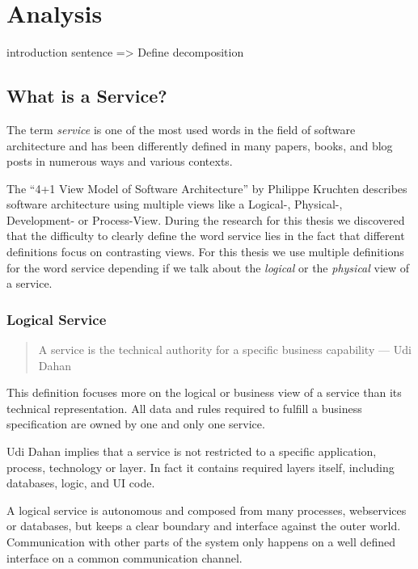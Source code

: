 
\chapter{Analysis}
\label{cha:analysis}

introduction sentence
=> Define decomposition

\section{What is a Service?}

The term \textit{service} is one of the most used words in the field of software architecture and has been differently defined in many papers, books, and blog posts in numerous ways and various contexts. 

The \enquote{4+1 View Model of Software Architecture} by Philippe Kruchten\cite{fourPlusOne} describes software architecture using multiple views like a \mbox{Logical-}, \mbox{Physical-}, \mbox{Development-} or  \mbox{Process-}View. During the research for this thesis we discovered that the difficulty to clearly define the word service lies in the fact that different definitions focus on contrasting views. For this thesis we use multiple definitions for the word service depending if we talk about the \textit{logical} or the \textit{physical} view of a service.

\subsection{Logical Service}

\begin{quotation}
A service is the technical authority for a specific business capability --- Udi Dahan\cite{serviceDefinitionDahan}
\end{quotation}
   
This definition focuses more on the logical or business view of a service than its technical representation. All data and rules required to fulfill a business specification are owned by one and only one service. 

Udi Dahan implies that a service is not restricted to a specific application, process, technology or layer. In fact it contains required layers itself, including databases, logic, and \gls{UI} code.

A logical service is autonomous and composed from many processes, webservices or databases, but keeps a clear boundary and interface against the outer world. Communication with other parts of the system only happens on a well defined interface on a common communication channel.

